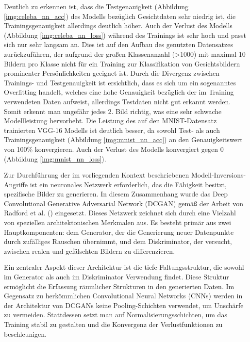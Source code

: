  Deutlich zu erkennen ist, dass die Testgenauigkeit (Abbildung \ref{img:celeba_nn_acc}) des Modells bezüglich Gesichtdaten sehr niedrig ist, die Trainingsgenauigkeit allerdings deutlich höher. Auch der Verlust des Modells (Abbildung \ref{img:celeba_nn_loss}) während des Trainings ist sehr hoch und passt sich nur sehr langsam an. Dies ist auf den Aufbau des genutzten Datensatzes zurückzuführen, der aufgrund der großen Klassenanzahl (>1000) mit maximal 10 Bildern pro Klasse nicht für ein Training zur Klassifikation von Gesichtsbildern prominenter Persönlichkeiten geeignet ist. Durch die Divergenz zwischen Trainings- und Testgenauigkeit ist ersichtlich, dass es sich um ein sogenanntes Overfitting handelt, welches eine hohe Genauigkeit bezüglich der im Training verwendeten Daten aufweist, allerdings Testdaten nicht gut erkannt werden. Somit erkennt man ungefähr jedes 2. Bild richtig, was eine sehr schwache Modellleistung hervorhebt. Die Leistung des auf den MNIST-Datensatz trainierten VGG-16 Modells ist deutlich besser, da sowohl Test- als auch Trainingsgenauigkeit (Abbildung \ref{img:mnist_nn_acc}) an den Genauigkeitswert von 100\% konvergieren. Auch der Verlust des Modells konvergiert gegen 0 (Abbildung \ref{img:mnist_nn_loss}).

Zur Durchführung der im vorliegenden Kontext beschriebenen Modell-Inversions-Angriffe ist ein neuronales Netzwerk erforderlich, das die Fähigkeit besitzt, spezifische Bilder zu generieren. In diesem Zusammenhang wurde das Deep Convolutional Generative Adversarial Network (DCGAN) gemäß der Arbeit von Radford et al. (\cite{radford_unsupervised_2016}) eingesetzt. Dieses Netzwerk zeichnet sich durch eine Vielzahl von speziellen architektonischen Merkmalen aus. Es besteht primär aus zwei Hauptkomponenten: dem Generator, der die Generierung neuer Datenpunkte durch zufälliges Rauschen übernimmt, und dem Diskriminator, der versucht, zwischen realen und gefälschten Bildern zu differenzieren.

Ein zentraler Aspekt dieser Architektur ist die tiefe Faltungsstruktur, die sowohl im Generator als auch im Diskriminator Verwendung findet. Diese Struktur ermöglicht die Erfassung räumlicher Strukturen in den generierten Daten. Im Gegensatz zu herkömmlichen Convolutional Neural Networks (CNNs) werden in der Architektur von DCGANs keine Pooling-Schichten verwendet, um Unschärfe zu vermeiden. Stattdessen setzt man auf Normalisierungsschichten, um das Training stabil zu gestalten und die Konvergenz der Verlustfunktionen zu beschleunigen.

